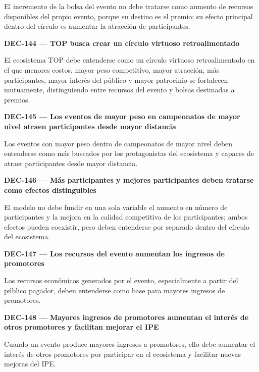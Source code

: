 \documentclass[10pt,letterpaper]{article}
\begin{document}
El incremento de la bolsa del evento no debe tratarse como aumento de recursos disponibles del propio evento, porque su destino es el premio; su efecto principal dentro del círculo es aumentar la atracción de participantes.\par\vspace{0.45em}
\noindent\textbf{DEC-144 --- TOP busca crear un círculo virtuoso retroalimentado}\par
El ecosistema TOP debe entenderse como un círculo virtuoso retroalimentado en el que menores costos, mayor peso competitivo, mayor atracción, más participantes, mayor interés del público y mayor patrocinio se fortalecen mutuamente, distinguiendo entre recursos del evento y bolsas destinadas a premios.\par\vspace{0.45em}
\noindent\textbf{DEC-145 --- Los eventos de mayor peso en campeonatos de mayor nivel atraen participantes desde mayor distancia}\par
Los eventos con mayor peso dentro de campeonatos de mayor nivel deben entenderse como más buscados por los protagonistas del ecosistema y capaces de atraer participantes desde mayor distancia.\par\vspace{0.45em}
\noindent\textbf{DEC-146 --- Más participantes y mejores participantes deben tratarse como efectos distinguibles}\par
El modelo no debe fundir en una sola variable el aumento en número de participantes y la mejora en la calidad competitiva de los participantes; ambos efectos pueden coexistir, pero deben entenderse por separado dentro del círculo del ecosistema.\par\vspace{0.45em}
\noindent\textbf{DEC-147 --- Los recursos del evento aumentan los ingresos de promotores}\par
Los recursos económicos generados por el evento, especialmente a partir del público pagador, deben entenderse como base para mayores ingresos de promotores.\par\vspace{0.45em}
\noindent\textbf{DEC-148 --- Mayores ingresos de promotores aumentan el interés de otros promotores y facilitan mejorar el IPE}\par
Cuando un evento produce mayores ingresos a promotores, ello debe aumentar el interés de otros promotores por participar en el ecosistema y facilitar nuevas mejoras del IPE.\par\vspace{0.45em}
\end{document}
